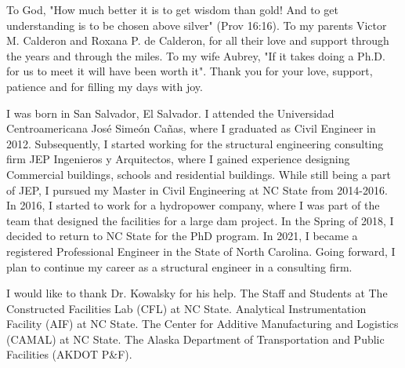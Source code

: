 \maketitlepage

\begin{dedication}
\centering
To God, "How much better it is to get wisdom than gold! And to get understanding is to be chosen above silver" (Prov 16:16). 
 \newline To my parents Victor M. Calderon and Roxana P. de Calderon, for all their love and support through the years and through the miles. 
 \newline To my wife Aubrey, "If it takes doing a Ph.D. for us to meet it will have been worth it". Thank you for your love, support, patience and for filling my days with joy.
\end{dedication}
%
\begin{biography}
I was born in San Salvador, El Salvador. I attended the Universidad Centroamericana José Simeón Cañas, where I graduated as Civil Engineer in 2012. Subsequently, I started working for the structural engineering consulting firm JEP Ingenieros y Arquitectos, where I gained experience designing Commercial buildings, schools and residential buildings. While still being a part of JEP, I pursued my Master in Civil Engineering at NC State from 2014-2016. In 2016, I started to work for a hydropower company, where I was part of the team that designed the facilities for a large dam project. In the Spring of 2018, I decided to return to NC State for the PhD program. In 2021, I became a registered Professional Engineer in the State of North Carolina. Going forward, I plan to continue my career as a structural engineer in a consulting firm.
\end{biography}
%
\begin{acknowledgements}
I would like to thank Dr. Kowalsky for his help. The Staff and Students at The Constructed Facilities Lab (CFL) at NC State. Analytical Instrumentation Facility (AIF) at NC State. The Center for Additive Manufacturing and Logistics (CAMAL) at NC State. The Alaska Department of Transportation and Public Facilities (AKDOT P\&F).
\end{acknowledgements}


\thesistableofcontents

\thesislistoftables

\thesislistoffigures
